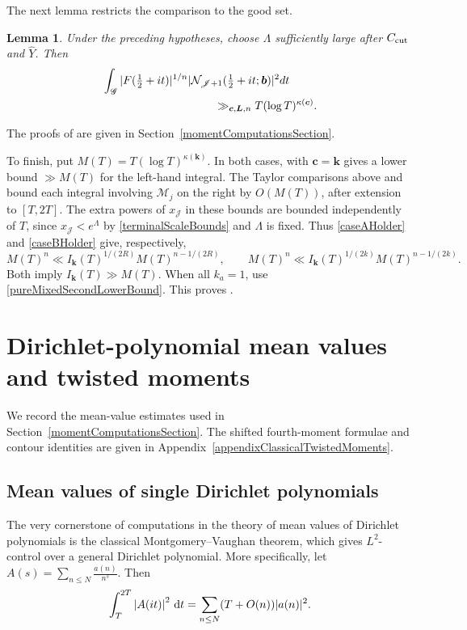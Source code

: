 \documentclass[oneside, 12pt]{amsart}
\newtheorem{lem}[thm]{Lemma}
\theoremstyle{definition}
\newcommand{\dt}{\, \textup{d}t}
\begin{document}
{		The next lemma restricts the comparison to the good set.
		
		\begin{lem}\label{modifiedHeathBrownOneOverN}
			Under the preceding hypotheses, choose $\Lambda$ sufficiently large
			after $C_{\rm cut}$ and $\widehat Y$.  Then
			\begin{align}
				&\int_{\mathscr G}|F(\tfrac12+it)|^{1/n}
				|\mathcal N_{\mathscr J+1}(\tfrac12+it;\boldsymbol b)|^2dt\nonumber\\
				&\hspace{35mm}\gg_{\boldsymbol c,\boldsymbol L,n}
				T(\log T)^{\kappa(\boldsymbol c)}.
				\label{oneOverNLowerMean}
			\end{align}
		\end{lem}
		
		The proofs of
		are given in Section~\ref{momentComputationsSection}.
		
		To finish, put $M(T)=T(\log T)^{\kappa(\boldsymbol k)}$.
		In both cases,  with
		$\boldsymbol c=\boldsymbol k$ gives a lower bound $\gg M(T)$ for the
		left-hand integral.  The Taylor comparisons above and
		 bound each integral involving
		$\mathcal M_j$ on the right by $O(M(T))$, after extension to
		$[T,2T]$. The extra powers of $x_{\mathscr J}$ in these bounds are
		bounded independently of $T$, since $x_{\mathscr J}<e^\Lambda$ by
		\eqref{terminalScaleBounds} and $\Lambda$ is fixed. Thus \eqref{caseAHolder} and \eqref{caseBHolder}
		give, respectively,
		\[
		M(T)^n\ll I_{\boldsymbol k}(T)^{1/(2R)}M(T)^{n-1/(2R)},
		\qquad
		M(T)^n\ll I_{\boldsymbol k}(T)^{1/(2k)}M(T)^{n-1/(2k)}.
		\]
		Both imply $I_{\boldsymbol k}(T)\gg M(T)$.  When all $k_a=1$,
		use \eqref{pureMixedSecondLowerBound}.  This proves .
		
	}
	
	{\section{Dirichlet-polynomial mean values and twisted moments}\label{twistedMomentsSection}
		We record the mean-value estimates used in Section~\ref{momentComputationsSection}.
		The shifted fourth-moment formulae and contour identities are given in
		Appendix~\ref{appendixClassicalTwistedMoments}.}
	\subsection{Mean values of single Dirichlet polynomials}
	The very cornerstone of computations in the theory of mean values of Dirichlet polynomials is the classical Montgomery--Vaughan theorem, which gives $L^2$-control over a general Dirichlet polynomial. More specifically, let $A(s)=\sum_{n \leq N} \frac{a(n)}{n^s}$. Then $$\int_{T}^{2T}\left|A(it)\right|^2\dt = \sum_{n\leq N} (T+O(n))|a(n)|^2.$$ 
	
\end{document}
